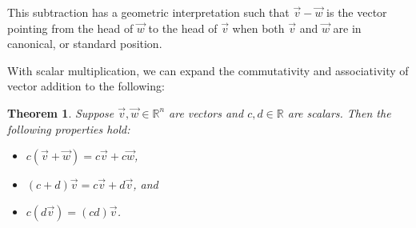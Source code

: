 \documentclass[11pt]{amsart} %
\theoremstyle{plain}
\newtheorem{thrm}{Theorem}
\theoremstyle{definition}
\theoremstyle{definition}
\theoremstyle{remark}
\theoremstyle{definition}
\begin{document}
This subtraction has a geometric interpretation such that $\vec{v}-\vec{w}$ is the vector pointing from the head of $\vec{w}$ to the head of $\vec{v}$ when both $\vec{v}$ and $\vec{w}$ are in canonical, or standard position.


With scalar multiplication, we can expand the commutativity and associativity of vector addition to the following:
\begin{thrm}
Suppose $\vec{v},\vec{w}\in\mathbb{R}^{n}$ are vectors and $c,d\in\mathbb{R}$ are scalars. Then the following properties hold:
      \begin{itemize}
            \item $c(\vec{v}+\vec{w}) = c\vec{v}+c\vec{w}$,
            \item $(c+d)\vec{v} = c\vec{v}+d\vec{v}$, and
            \item $c(d\vec{v}) = (cd)\vec{v}$.
      \end{itemize}
\end{thrm}
\end{document}
